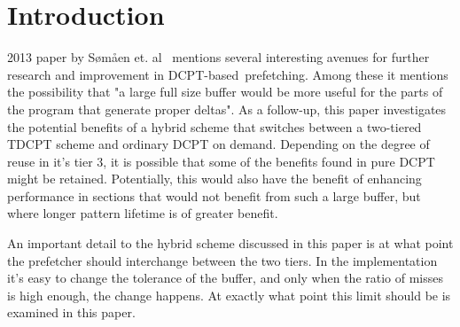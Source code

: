 \section{Introduction}

 2013 paper by Sømåen et. al~\cite{Somaen} mentions several
interesting avenues for further research and improvement in
DCPT-based~\footnotemark[1] prefetching. Among these it mentions the
possibility that "a large full size buffer would be more useful for the parts
of the program that generate proper deltas". As a follow-up, this paper
investigates the potential benefits of a hybrid scheme that switches between a
two-tiered TDCPT scheme and ordinary DCPT on demand. Depending on the degree of
reuse in it's tier 3, it is possible that some of the benefits found in pure
DCPT might be retained. Potentially, this would also have the benefit of
enhancing performance in sections that would not benefit from such a large
buffer, but where longer pattern lifetime is of greater benefit.


An important detail to the hybrid scheme discussed in this paper is at what
point the prefetcher should interchange between the two tiers. In the
implementation it's easy to change the tolerance of the buffer, and only when
the ratio of misses is high enough, the change happens. At exactly what point
this limit should be is examined in this paper.

